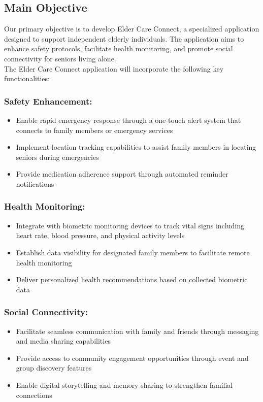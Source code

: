 \subsection{Main Objective}

Our primary objective is to develop Elder Care Connect, a specialized application designed to support independent elderly individuals. The application aims to enhance safety protocols, facilitate health monitoring, and promote social connectivity for seniors living alone.\\
The Elder Care Connect application will incorporate the following key functionalities:

\subsubsection*{Safety Enhancement:}
\begin{itemize}
    \item Enable rapid emergency response through a one-touch alert system that connects to family members or emergency services
    \item Implement location tracking capabilities to assist family members in locating seniors during emergencies
    \item Provide medication adherence support through automated reminder notifications
\end{itemize}

\subsubsection*{Health Monitoring:}
\begin{itemize}
    \item Integrate with biometric monitoring devices to track vital signs including heart rate, blood pressure, and physical activity levels
    \item Establish data visibility for designated family members to facilitate remote health monitoring
    \item Deliver personalized health recommendations based on collected biometric data
\end{itemize}

\subsubsection*{Social Connectivity:}
\begin{itemize}
    \item Facilitate seamless communication with family and friends through messaging and media sharing capabilities
    \item Provide access to community engagement opportunities through event and group discovery features
    \item Enable digital storytelling and memory sharing to strengthen familial connections
\end{itemize}


